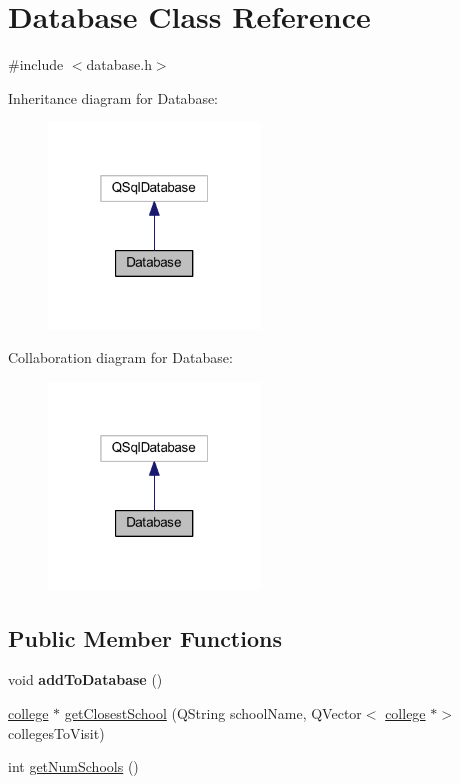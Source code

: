 \hypertarget{class_database}{}\section{Database Class Reference}
\label{class_database}


{\ttfamily \#include $<$database.\+h$>$}



Inheritance diagram for Database\+:\nopagebreak
\begin{figure}[H]
\begin{center}
\leavevmode
\includegraphics[width=160pt]{class_database__inherit__graph}
\end{center}
\end{figure}


Collaboration diagram for Database\+:\nopagebreak
\begin{figure}[H]
\begin{center}
\leavevmode
\includegraphics[width=160pt]{class_database__coll__graph}
\end{center}
\end{figure}
\subsection*{Public Member Functions}
\begin{DoxyCompactItemize}
\item 
\mbox{\label{class_database_a76a9b0363174bdd6c70a052a088cfaf8}} 
void {\bfseries add\+To\+Database} ()
\item 
\hyperlink{classcollege}{college} $\ast$ \hyperlink{class_database_affe7eb5c35db111e3ff7dc752f5a6c38}{get\+Closest\+School} (Q\+String school\+Name, Q\+Vector$<$ \hyperlink{classcollege}{college} $\ast$$>$ colleges\+To\+Visit)
\item 
int \hyperlink{class_database_aa5d167b5300b715844a760ed9d7e223f}{get\+Num\+Schools} ()
\end{DoxyCompactItemize}
